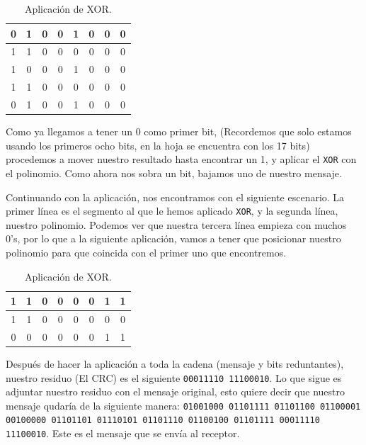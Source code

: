\documentclass[spanish,12pt,letterpaper]{article}
\begin{document}
\begin{table}[H]
  \centering
  \begin{tabular}{| c | c | c | c | c | c | c | c |}\hline
    0 & 1 & 0 & 0 & 1 & 0 & 0 & 0 \\ \hline
    1 & 1 & 0 & 0 & 0 & 0 & 0 & 0 \\ \hline
    1 & 0 & 0 & 0 & 1 & 0 & 0 & 0 \\ \hline
    1 & 1 & 0 & 0 & 0 & 0 & 0 & 0 \\ \hline
    0 & 1 & 0 & 0 & 1 & 0 & 0 & 0 \\ \hline
  \end{tabular}
  \caption{Aplicación de XOR.}
\end{table}

Como ya llegamos a tener un 0 como primer bit, (Recordemos que solo estamos
usando los primeros ocho bits, en la hoja se encuentra con los 17 bits)
procedemos a mover nuestro resultado hasta encontrar un 1, y aplicar el
\texttt{XOR} con el polinomio. Como ahora nos sobra un bit, bajamos uno de
nuestro mensaje.

Continuando con la aplicación, nos encontramos con el siguiente escenario. La
primer línea es el segmento al que le hemos aplicado \texttt{XOR}, y la segunda
línea, nuestro polinomio. Podemos ver que nuestra tercera línea empieza con
muchos 0's, por lo que a la siguiente aplicación, vamos a tener que posicionar
nuestro polinomio para que coincida con el primer uno que encontremos.

\begin{table}[H]
  \centering
  \begin{tabular}{| c | c | c | c | c | c | c | c |}\hline
    1 & 1 & 0 & 0 & 0 & 0 & 1 & 1 \\ \hline
    1 & 1 & 0 & 0 & 0 & 0 & 0 & 0 \\ \hline
    0 & 0 & 0 & 0 & 0 & 0 & 1 & 1 \\ \hline
  \end{tabular}
  \caption{Aplicación de XOR.}
\end{table}

Después de hacer la aplicación a toda la cadena (mensaje y bits reduntantes),
nuestro residuo (El CRC) es el siguiente \texttt{00011110 11100010}. Lo que sigue
es adjuntar nuestro residuo con el mensaje original, esto quiere decir que
nuestro mensaje qudaría de la siguiente manera: \texttt{01001000 01101111
  01101100 01100001 00100000 01101101 01110101 01101110 01100100 01101111
  00011110 11100010}. Este es el mensaje que se envía al receptor.
\end{document}
